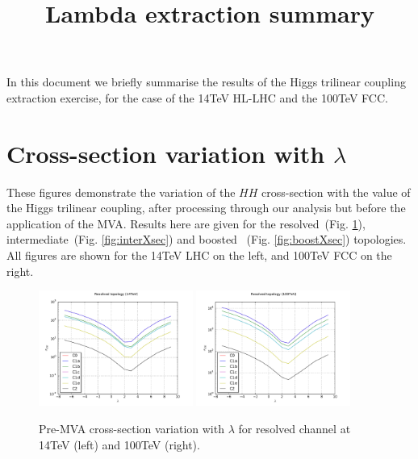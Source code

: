\documentclass[11pt]{article}
\title{Lambda extraction summary}
\begin{document}
\maketitle

In this document we briefly summarise the results of the Higgs trilinear coupling extraction exercise, for the case of the 14TeV HL-LHC and
the 100TeV FCC.
\section{Cross-section variation with $\lambda$}
These figures demonstrate the variation of the $HH$ cross-section with the value of the Higgs trilinear coupling, after processing through our analysis
but before the application of the MVA. Results here are given for the resolved~(Fig. \ref{fig:resXsec}), intermediate~(Fig. \ref{fig:interXsec}) and boosted ~(Fig. \ref{fig:boostXsec}) topologies. All figures are shown for the 14TeV LHC on the left, and 100TeV FCC on the right.

\begin{figure}[htbp]
\begin{center}
\includegraphics[width=0.45\textwidth]{plots/res_xSec_14TeV.pdf}
\includegraphics[width=0.45\textwidth]{plots/res_xSec_100TeV.pdf}
\caption{Pre-MVA cross-section variation with $\lambda$ for resolved channel at 14TeV (left) and 100TeV (right).}
\label{fig:resXsec}
\end{center}
\end{figure}
\end{document}
